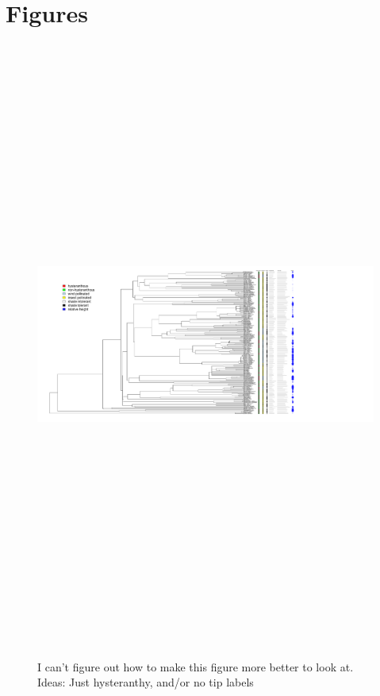 \documentclass{article}\usepackage[]{graphicx}\usepackage[]{color}
\begin{document}
\section*{Figures}
\begin{figure}[h!]
\includegraphics[width=20cm, height=20cm]{../figure/mich_phylo_alltraits.pdf}\\
\caption{I can't figure out how to make this figure more better to look at. Ideas: Just hysteranthy, and/or no tip labels}
\end{figure}
\end{document}
